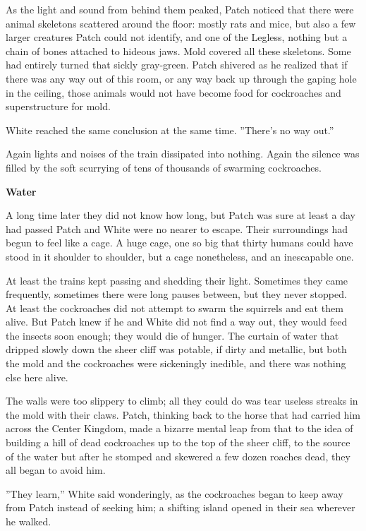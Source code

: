 \documentclass[11pt]{article}
\begin{document}
 As the light and sound from behind them peaked, Patch noticed that there were animal skeletons scattered around the floor: mostly rats and mice, but also a few larger creatures Patch could not identify, and one of the Legless, nothing but a chain of bones attached to hideous jaws. Mold covered all these skeletons. Some had entirely turned that sickly gray-green. Patch shivered as he realized that if there was any way out of this room, or any way back up through the gaping hole in the ceiling, those animals would not have become food for cockroaches and superstructure for mold.\par
 White reached the same conclusion at the same time. ''There's no way out.''\par
 Again lights and noises of the train dissipated into nothing. Again the silence was filled by the soft scurrying of tens of thousands of swarming cockroaches.\par
\par
{\bf Water\par
}\par
 A long time later %
 they did not know how long, but Patch was sure at least a day had passed %
 Patch and White were no nearer to escape. Their surroundings had begun to feel like a cage. A huge cage, one so big that thirty humans could have stood in it shoulder to shoulder, but a cage nonetheless, and an inescapable one.\par
 At least the trains kept passing and shedding their light. Sometimes they came frequently, sometimes there were long pauses between, but they never stopped. At least the cockroaches did not attempt to swarm the squirrels and eat them alive. But Patch knew if he and White did not find a way out, they would feed the insects soon enough; they would die of hunger. The curtain of water that dripped slowly down the sheer cliff was potable, if dirty and metallic, but both the mold and the cockroaches were sickeningly inedible, and there was nothing else here alive.\par
 The walls were too slippery to climb; all they could do was tear useless streaks in the mold with their claws. Patch, thinking back to the horse that had carried him across the Center Kingdom, made a bizarre mental leap from that to the idea of building a hill of dead cockroaches up to the top of the sheer cliff, to the source of the water %
 but after he stomped and skewered a few dozen roaches dead, they all began to avoid him.\par
 ''They learn,'' White said wonderingly, as the cockroaches began to keep away from Patch instead of seeking him; a shifting island opened in their sea wherever he walked.\par
\end{document}
